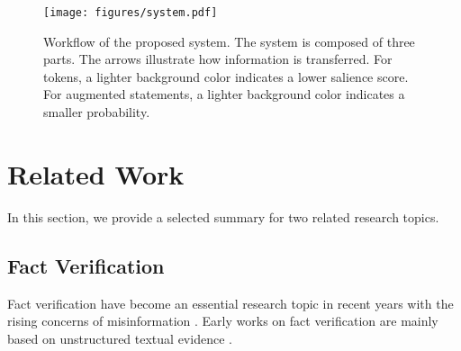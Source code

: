 \documentclass[11pt]{article}
\begin{document}
\begin{figure*}[t]
\centering
\texttt{[image: figures/system.pdf]}
\caption{
Workflow of the proposed system. The system is composed of three parts. The arrows illustrate how information is transferred. For tokens, a lighter background color indicates a lower salience score. For augmented statements, a lighter background color indicates a smaller probability.
}
\label{fig:system}
\end{figure*}
 \section{Related Work}

In this section, we provide a selected summary for two related research topics.

\subsection{Fact Verification}
Fact verification have become an essential research topic in recent years with the rising concerns of misinformation \cite{vlachos2014fact, wang2017liar, thorne2018fever, khattar2019mvae, zellers2019defending, chen2019tabfact}. 
Early works on fact verification are mainly based on unstructured textual evidence \cite{yin2018twowingos, nie2019combining, zhou2019gear}. 
\end{document}
